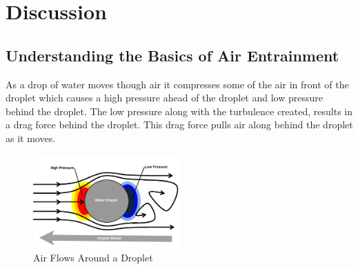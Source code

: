 \documentclass[12pt,oneside]{book}
\begin{document}




\chapter{Discussion}

\section{Understanding the Basics of Air Entrainment}
As a drop of water moves though air it compresses some of the air in front of the droplet which causes a high pressure ahead of the droplet and low pressure behind the droplet. The low pressure along with the turbulence created, results in a drag force behind the droplet. This drag force pulls air along behind the droplet as it moves.

\begin{figure}[H]
\centering
\includegraphics[width=0.5\textwidth]{Figures/Air_Entrainment/Droplet_Etrainment.png}
\caption{Air Flows Around a Droplet}
\label{fig:droplet_flow}
\end{figure}
\end{document}
